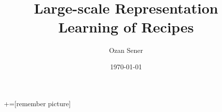 \documentclass[12 pt,aspectratio=85]{beamer}
\author[Ozan Sener\quad {os79@cornell.edu}]{Ozan Sener}
\title[Recipe Representation]{Large-scale Representation Learning of Recipes}
\institute{Cornell University}
\date{\today}
\begin{document}

+=[remember picture]





%
\end{document}
